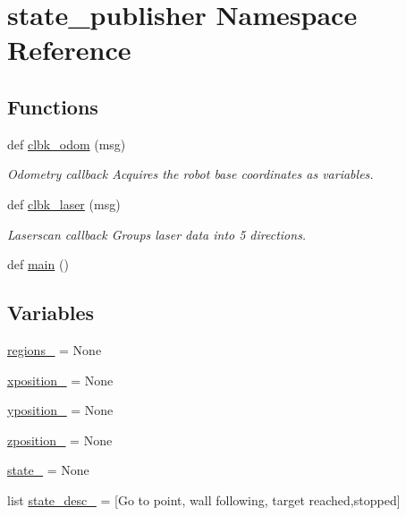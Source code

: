 \hypertarget{namespacestate__publisher}{}\section{state\+\_\+publisher Namespace Reference}
\label{namespacestate__publisher}
\subsection*{Functions}
\begin{DoxyCompactItemize}
\item 
def \hyperlink{namespacestate__publisher_a3d316c79a18d0589241e385f51903e52}{clbk\+\_\+odom} (msg)
\begin{DoxyCompactList}\small\item\em Odometry callback Acquires the robot base coordinates as variables. \end{DoxyCompactList}\item 
def \hyperlink{namespacestate__publisher_a41bd1c00d568596d195d0ce25c9e7d59}{clbk\+\_\+laser} (msg)
\begin{DoxyCompactList}\small\item\em Laserscan callback Groups laser data into 5 directions. \end{DoxyCompactList}\item 
def \hyperlink{namespacestate__publisher_ac9481bf4b80b3e0c863732939d060a4e}{main} ()
\end{DoxyCompactItemize}
\subsection*{Variables}
\begin{DoxyCompactItemize}
\item 
\hyperlink{namespacestate__publisher_ab7132fcdb3b135c9865d93ca8a41b889}{regions\+\_\+} = None
\item 
\hyperlink{namespacestate__publisher_a5cd2539591061514c0d16846bc660a62}{xposition\+\_\+} = None
\item 
\hyperlink{namespacestate__publisher_a29c8334e3a68780cdba59b00b368d5fd}{yposition\+\_\+} = None
\item 
\hyperlink{namespacestate__publisher_aa1d815a50ea42fd4e96793b6839473f9}{zposition\+\_\+} = None
\item 
\hyperlink{namespacestate__publisher_a43f0bf52594d3691f18d8d9181e36b1b}{state\+\_\+} = None
\item 
list \hyperlink{namespacestate__publisher_aa8361482ad30732347576ea45828316e}{state\+\_\+desc\+\_\+} = \mbox{[}\textquotesingle{}Go to point\textquotesingle{}, \textquotesingle{}wall following\textquotesingle{}, \textquotesingle{}target reached\textquotesingle{},\textquotesingle{}stopped\textquotesingle{}\mbox{]}
\end{DoxyCompactItemize}


